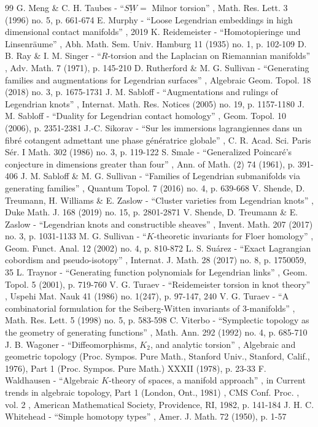 \documentclass[11pt]{article}
\numberwithin{equation}{section}\providecommand{\dpl}{\displaystyle}
\theoremstyle{plain}
\theoremstyle{definition}
\begin{document}
\begin{thebibliography}{99}
 G. Meng \& C. H. Taubes - “$\underline{\mathit{SW}}=$ Milnor torsion” , Math. Res. Lett. 3 (1996) no. 5, p. 661-674
 E. Murphy - “Loose Legendrian embeddings in high dimensional contact manifolds” , 2019
 K. Reidemeister - “Homotopieringe und Linsenräume” , Abh. Math. Sem. Univ. Hamburg 11 (1935) no. 1, p. 102-109
 D. B. Ray \& I. M. Singer - “$R$-torsion and the Laplacian on Riemannian manifolds” , Adv. Math. 7 (1971), p. 145-210
 D. Rutherford \& M. G. Sullivan - “Generating families and augmentations for Legendrian surfaces” , Algebraic Geom. Topol. 18 (2018) no. 3, p. 1675-1731
 J. M. Sabloff - “Augmentations and rulings of Legendrian knots” , Internat. Math. Res. Notices (2005) no. 19, p. 1157-1180
 J. M. Sabloff - “Duality for Legendrian contact homology” , Geom. Topol. 10 (2006), p. 2351-2381
 J.-C. Sikorav - “Sur les immersions lagrangiennes dans un fibré cotangent admettant une phase génératrice globale” , C. R. Acad. Sci. Paris Sér. I Math. 302 (1986) no. 3, p. 119-122
 S. Smale - “Generalized Poincaré’s conjecture in dimensions greater than four” , Ann. of Math. (2) 74 (1961), p. 391-406
 J. M. Sabloff \& M. G. Sullivan - “Families of Legendrian submanifolds via generating families” , Quantum Topol. 7 (2016) no. 4, p. 639-668
 V. Shende, D. Treumann, H. Williams \& E. Zaslow - “Cluster varieties from Legendrian knots” , Duke Math. J. 168 (2019) no. 15, p. 2801-2871
 V. Shende, D. Treumann \& E. Zaslow - “Legendrian knots and constructible sheaves” , Invent. Math. 207 (2017) no. 3, p. 1031-1133
 M. G. Sullivan - “$K$-theoretic invariants for Floer homology” , Geom. Funct. Anal. 12 (2002) no. 4, p. 810-872
 L. S. Suárez - “Exact Lagrangian cobordism and pseudo-isotopy” , Internat. J. Math. 28 (2017) no. 8, p. 1750059, 35
 L. Traynor - “Generating function polynomials for Legendrian links” , Geom. Topol. 5 (2001), p. 719-760
 V. G. Turaev - “Reidemeister torsion in knot theory” , Uspehi Mat. Nauk 41 (1986) no. 1(247), p. 97-147, 240
 V. G. Turaev - “A combinatorial formulation for the Seiberg-Witten invariants of $3$-manifolds” , Math. Res. Lett. 5 (1998) no. 5, p. 583-598
 C. Viterbo - “Symplectic topology as the geometry of generating functions” , Math. Ann. 292 (1992) no. 4, p. 685-710
 J. B. Wagoner - “Diffeomorphisms, $K_{2}$, and analytic torsion” , Algebraic and geometric topology (Proc. Sympos. Pure Math., Stanford Univ., Stanford, Calif., 1976), Part 1 (Proc. Sympos. Pure Math.) XXXII (1978), p. 23-33
 F. Waldhausen - “Algebraic $K$-theory of spaces, a manifold approach” , in Current trends in algebraic topology, Part 1 (London, Ont., 1981) , CMS Conf. Proc. , vol. 2 , American Mathematical Society, Providence, RI, 1982, p. 141-184
 J. H. C. Whitehead - “Simple homotopy types” , Amer. J. Math. 72 (1950), p. 1-57
\end{thebibliography}
\end{document}
